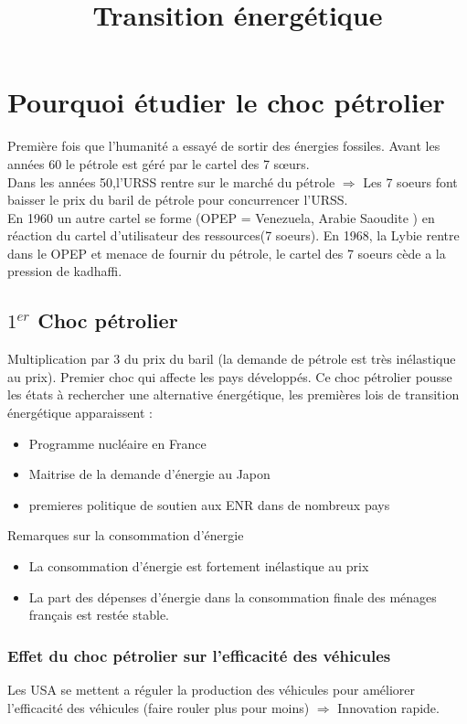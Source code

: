 \documentclass{article}
\title{Transition énergétique}
\begin{document}
	\maketitle
	
\section{Pourquoi étudier le choc pétrolier}
Première fois que l'humanité a essayé de sortir des énergies fossiles. Avant les années 60 le pétrole est géré par le cartel des 7 sœurs. \\
Dans les années 50,l'URSS rentre sur le marché du pétrole $ \Rightarrow $ Les 7 soeurs font baisser le prix du baril de pétrole pour concurrencer l'URSS. \\
En 1960 un autre cartel se forme (OPEP = Venezuela, Arabie Saoudite ) en réaction du cartel d'utilisateur des ressources(7 soeurs). En 1968, la Lybie rentre dans le OPEP et menace de fournir du pétrole, le cartel des 7 soeurs cède a la pression de kadhaffi. 
\subsection{$1^{er}$ Choc pétrolier}
Multiplication par 3 du prix du baril (la demande de pétrole est très inélastique au prix). Premier choc qui affecte les pays développés. Ce choc pétrolier pousse les états à rechercher une alternative énergétique, les premières lois de transition énergétique apparaissent  : 
\begin{itemize}
	\item Programme nucléaire en France
	\item Maitrise de la demande d'énergie au Japon
	\item premieres politique de soutien aux ENR dans de nombreux pays
\end{itemize}
Remarques sur la consommation d'énergie
\begin{itemize}
	\item La consommation d'énergie est fortement inélastique au prix
	\item La part des dépenses d'énergie dans la consommation finale des ménages français est restée stable.
\end{itemize}

\subsubsection{Effet du choc pétrolier sur l'efficacité des véhicules}
Les USA se mettent a réguler la production des véhicules pour améliorer l'efficacité des véhicules (faire rouler plus pour moins) $ \Rightarrow $ Innovation rapide. 
\end{document}
